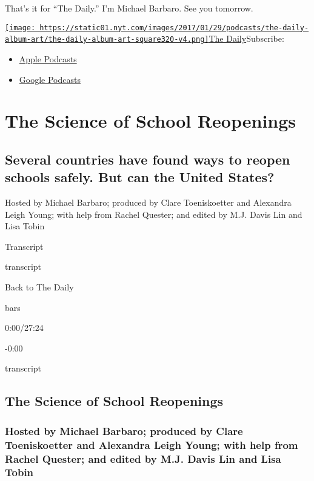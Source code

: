 That's it for ``The Daily.'' I'm Michael Barbaro. See you tomorrow.

\href{https://www.nytimes.com/column/the-daily}{\texttt{[image: https://static01.nyt.com/images/2017/01/29/podcasts/the-daily-album-art/the-daily-album-art-square320-v4.png]}The
Daily}Subscribe:

\begin{itemize}
\tightlist
\item
  \href{https://itunes.apple.com/us/podcast/id1200361736}{Apple
  Podcasts}
\item
  \href{https://www.google.com/podcasts?feed=aHR0cHM6Ly9yc3MuYXJ0MTkuY29tL3RoZS1kYWlseQ\%3D\%3D}{Google
  Podcasts}
\end{itemize}

\hypertarget{the-science-of-school-reopenings-1}{%
\section{The Science of School
Reopenings}\label{the-science-of-school-reopenings-1}}

\hypertarget{several-countries-have-found-ways-to-reopen-schools-safely-but-can-the-united-states-1}{%
\subsection{Several countries have found ways to reopen schools safely.
But can the United
States?}\label{several-countries-have-found-ways-to-reopen-schools-safely-but-can-the-united-states-1}}

Hosted by Michael Barbaro; produced by Clare Toeniskoetter and Alexandra
Leigh Young; with help from Rachel Quester; and edited by M.J. Davis Lin
and Lisa Tobin

Transcript

transcript

Back to The Daily

bars

0:00/27:24

-0:00

transcript

\hypertarget{the-science-of-school-reopenings-2}{%
\subsection{The Science of School
Reopenings}\label{the-science-of-school-reopenings-2}}

\hypertarget{hosted-by-michael-barbaro-produced-by-clare-toeniskoetter-and-alexandra-leigh-young-with-help-from-rachel-quester-and-edited-by-mj-davis-lin-and-lisa-tobin-1}{%
\subsubsection{Hosted by Michael Barbaro; produced by Clare
Toeniskoetter and Alexandra Leigh Young; with help from Rachel Quester;
and edited by M.J. Davis Lin and Lisa
Tobin}\label{hosted-by-michael-barbaro-produced-by-clare-toeniskoetter-and-alexandra-leigh-young-with-help-from-rachel-quester-and-edited-by-mj-davis-lin-and-lisa-tobin-1}}

